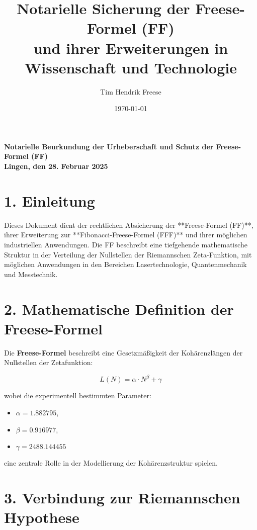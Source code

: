 \documentclass[a4paper,12pt]{article}
\title{Notarielle Sicherung der Freese-Formel (FF) \\ 
und ihrer Erweiterungen in Wissenschaft und Technologie}
\author{Tim Hendrik Freese}
\date{\today}
\begin{document}
\maketitle
\thispagestyle{empty}

\begin{center}
    \textbf{Notarielle Beurkundung der Urheberschaft und Schutz der Freese-Formel (FF)}\\
    \vspace{0.5cm}
    \textbf{Lingen, den 28. Februar 2025}
\end{center}

\section*{1. Einleitung}

Dieses Dokument dient der rechtlichen Absicherung der **Freese-Formel (FF)**, ihrer Erweiterung zur **Fibonacci-Freese-Formel (FFF)** und ihrer möglichen industriellen Anwendungen. Die FF beschreibt eine tiefgehende mathematische Struktur in der Verteilung der Nullstellen der Riemannschen Zeta-Funktion, mit möglichen Anwendungen in den Bereichen Lasertechnologie, Quantenmechanik und Messtechnik.

\section*{2. Mathematische Definition der Freese-Formel}

Die \textbf{Freese-Formel} beschreibt eine Gesetzmäßigkeit der Kohärenzlängen der Nullstellen der Zetafunktion:

\begin{equation}
L(N) = \alpha \cdot N^\beta + \gamma
\end{equation}

wobei die experimentell bestimmten Parameter:

\begin{itemize}
    \item $\alpha = 1.882795$,
    \item $\beta = 0.916977$,
    \item $\gamma = 2488.144455$
\end{itemize}

eine zentrale Rolle in der Modellierung der Kohärenzstruktur spielen.

\section*{3. Verbindung zur Riemannschen Hypothese}
\end{document}
